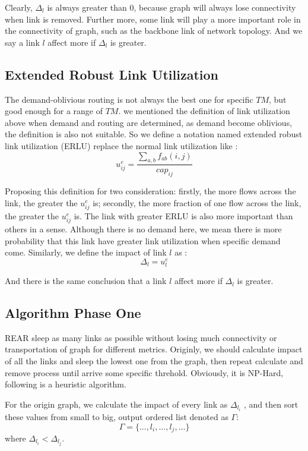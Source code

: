 \documentclass[conference]{IEEEtran}
\begin{document}
Clearly, $\Delta_l$ is always greater than 0, because graph will always lose connectivity when link is removed.
Further more, some link will play a more important role in the connectivity of graph, such as the backbone link 
of network topology. And we say a link $l$ affect more if $\Delta_l$ is greater.

\subsection{Extended Robust Link Utilization}
The demand-oblivious routing is not always the best one for 
specific $TM$, but good enough for a range of $TM$. we mentioned the definition of link utilization above when 
demand and routing are determined, as demand become oblivious, the definition is also not suitable. So we define
a notation named extended robust link utilization (ERLU) replace the normal link utilization like :
\begin{equation}
	u^e_{ij} = \frac {\sum_{a,b}f_{ab}(i,j)} {cap_{ij}}
\end{equation}


Proposing this definition for two consideration: firstly, the more flows across the link, the greater the $u^e_{ij}$ is;
secondly, the more fraction of one flow across the link, the greater the $u^e_{ij}$ is. The link with greater
ERLU is also more important than others in a sense. Although there is no demand here, we mean
there is more probability that this link have greater link utilization when specific demand come. Similarly, we define 
the impact of link $l$ as :
\begin{equation}
    \Delta_l = u^e_{l}
\end{equation}

And there is the same conclusion that a link $l$ affect more if $\Delta_l$ is greater.


\subsection{Algorithm Phase One}
REAR sleep as many links as possible without losing much connectivity or transportation of graph for different metrics. 
Originly,  we should calculate impact of all the links and sleep the lowest one from the graph, then repeat calculate and remove
process until arrive some specific threhold. Obviously, it is NP-Hard, following is a heuristic algorithm.


For the origin graph, we calculate the impact of every link as $\Delta_{l_i}$ , and then sort these values
from small to big, output ordered list denoted as $\Gamma$: 
\begin{equation}
	\Gamma = \{..., l_i, ..., l_j, ...\}
\end{equation}
where $\Delta_{l_i} < \Delta_{l_j}$.
\end{document}
